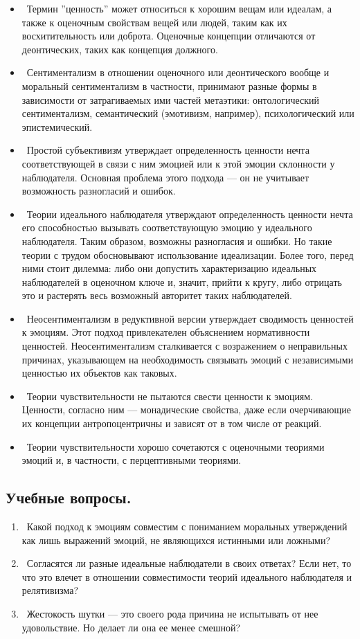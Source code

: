 \documentclass[11pt]{book}
\begin{document}
\begin{itemize}
  \item\ Термин ''ценность'' может относиться к хорошим вещам или идеалам, а также к оценочным свойствам вещей или людей, таким как их восхитительность или доброта. Оценочные концепции отличаются от деонтических, таких как концепция должного.
  \item\ Сентиментализм в отношении оценочного или деонтического вообще и моральный сентиментализм в частности, принимают разные формы в зависимости от затрагиваемых ими частей метаэтики: онтологический сентиментализм, семантический (эмотивизм, например), психологический или эпистемический.
  \item\ Простой субъективизм утверждает определенность ценности нечта соответствующей в связи с ним эмоцией или к этой эмоции склонности у наблюдателя. Основная проблема этого подхода --- он не учитывает возможность разногласий и ошибок.
  \item\ Теории идеального наблюдателя утверждают определенность ценности нечта его способностью вызывать соответствующую эмоцию у идеального наблюдателя. Таким образом, возможны разногласия и ошибки. Но такие теории с трудом обосновывают использование идеализации. Более того, перед ними стоит дилемма: либо они допустить характеризацию идеальных наблюдателей в оценочном ключе и, значит, прийти к кругу, либо отрицать это и растерять весь возможный авторитет таких наблюдателей.
  \item\ Неосентиментализм в редуктивной версии утверждает сводимость ценностей к эмоциям. Этот подход привлекателен объяснением нормативности ценностей. Неосентиментализм сталкивается с возражением о неправильных причинах, указывающем на необходимость связывать эмоций с независимыми ценностью их объектов как таковых.
  \item\ Теории чувствительности не пытаются свести ценности к эмоциям. Ценности, согласно ним --- монадические свойства, даже если очерчивающие их концепции антропоцентричны и зависят от в том числе от реакций.
  \item\ Теории чувствительности хорошо сочетаются с оценочными теориями эмоций и, в частности, с перцептивными теориями.
\end{itemize}

\begin{tcolorbox}
  \section{Учебные вопросы.}
  \begin{enumerate}
    \item\ Какой подход к эмоциям совместим с пониманием моральных утверждений как лишь выражений эмоций, не являющихся истинными или ложными?
    \item\ Согласятся ли разные идеальные наблюдатели в своих ответах? Если нет, то что это влечет в отношении совместимости теорий идеального наблюдателя и релятивизма?
    \item\ Жестокость шутки --- это своего рода причина не испытывать от нее удовольствие. Но делает ли она ее менее смешной?
  \end{enumerate}
\end{tcolorbox}
\end{document}
